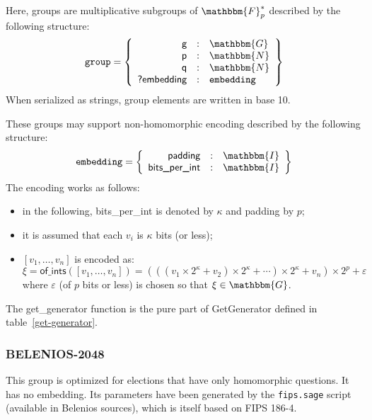 \documentclass[a4paper]{article}
\newcommand{\F}{\mathbbm{F}}
\newcommand{\G}{\mathbbm{G}}
\newcommand{\N}{\mathbbm{N}}
\newcommand{\I}{\mathbbm{I}}
\begin{document}
Here, groups are multiplicative subgroups of $\F^*_p$ described by the
following structure:
\begin{gather*}
  \texttt{group}=\left\{
    \begin{array}{rcl}
      \textsf{g}&:&\G\\
      \textsf{p}&:&\N\\
      \textsf{q}&:&\N\\
      \textsf{?embedding}&:&\texttt{embedding}
    \end{array}
  \right\}
\end{gather*}
When serialized as strings, group elements are written in base 10.

These groups may support non-homomorphic encoding described by the
following structure:
\begin{gather*}
  \texttt{embedding}=\left\{
    \begin{array}{rcl}
      \textsf{padding}&:&\I\\
      \textsf{bits\_per\_int}&:&\I
    \end{array}
  \right\}
\end{gather*}
The encoding works as follows:
\begin{itemize}
\item in the following, \textsf{bits\_per\_int} is denoted by $\kappa$
  and \textsf{padding} by $p$;
\item it is assumed that each $v_i$ is $\kappa$ bits (or less);
\item $[v_1,\dots,v_n]$ is encoded as:
  \[
    \xi=\textsf{of\_ints}([v_1,\dots,v_n])=(((v_1\times
    2^\kappa+v_2)\times 2^\kappa+\dotsb)\times 2^\kappa+v_n)\times
    2^p+\varepsilon
  \]
  where $\varepsilon$ (of $p$ bits or less) is chosen so that $\xi\in\G$.
\end{itemize}
The \textsf{get\_generator} function is the pure part of
\textsf{GetGenerator} defined in table~\ref{get-generator}.

\subsubsection{BELENIOS-2048}
\label{h-group}

This group is optimized for elections that have only homomorphic
questions. It has no \textsf{embedding}. Its parameters have been
generated by the \verb=fips.sage= script (available in Belenios
sources), which is itself based on FIPS 186-4.
\end{document}
